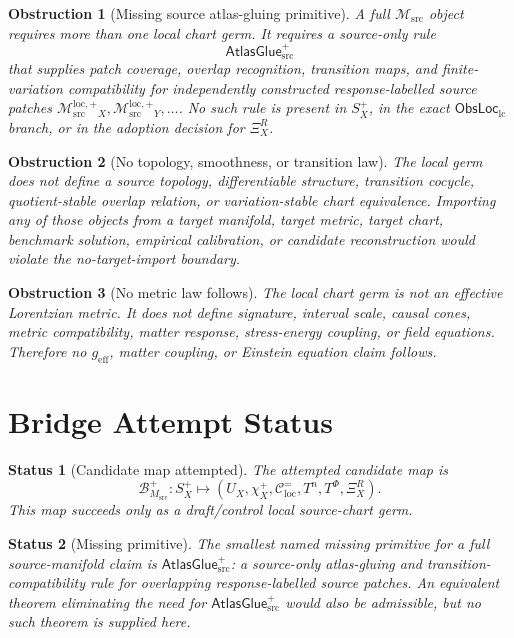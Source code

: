 \documentclass[11pt]{article}
\newcommand{\ObsLocLC}{\mathsf{ObsLoc}_{\mathrm{lc}}}
\newcommand{\Msrc}{\mathcal{M}_{\mathrm{src}}}
\newcommand{\Mloc}{\mathcal{M}_{\mathrm{src}}^{\mathrm{loc},+}}
\newcommand{\geff}{g_{\mathrm{eff}}}
\newcommand{\XiR}{\Xi_X^R}
\newcommand{\Splus}{S_X^+}
\newcommand{\Cexact}{\mathcal{C}^{=}_{\mathrm{loc}}}
\newcommand{\BMsrc}{\mathcal{B}^{+}_{M_{\mathrm{src}}}}
\newcommand{\AtlasGlue}{\mathsf{AtlasGlue}_{\mathrm{src}}^{+}}
\newtheorem{obstruction}{Obstruction}
\newtheorem{status}{Status}
\begin{document}
\begin{obstruction}[Missing source atlas-gluing primitive]
A full \(\Msrc\) object requires more than one local chart germ. It
requires a source-only rule
\[
  \AtlasGlue
\]
that supplies patch coverage, overlap recognition, transition maps,
and finite-variation compatibility for independently constructed
response-labelled source patches
\(\Mloc_X,\Mloc_Y,\ldots\). No such rule is present in \(\Splus\), in
the exact \(\ObsLocLC\) branch, or in the adoption decision for
\(\XiR\).
\end{obstruction}

\begin{obstruction}[No topology, smoothness, or transition law]
The local germ does not define a source topology, differentiable
structure, transition cocycle, quotient-stable overlap relation, or
variation-stable chart equivalence. Importing any of those objects
from a target manifold, target metric, target chart, benchmark
solution, empirical calibration, or candidate reconstruction would
violate the no-target-import boundary.
\end{obstruction}

\begin{obstruction}[No metric law follows]
The local chart germ is not an effective Lorentzian metric. It does
not define signature, interval scale, causal cones, metric
compatibility, matter response, stress-energy coupling, or field
equations. Therefore no \(\geff\), matter coupling, or Einstein
equation claim follows.
\end{obstruction}

\section{Bridge Attempt Status}

\begin{status}[Candidate map attempted]
The attempted candidate map is
\[
  \BMsrc:\Splus\mapsto
  (U_X,\chi_X^+,\Cexact,T^n,T^\Phi,\XiR).
\]
This map succeeds only as a draft/control local source-chart germ.
\end{status}

\begin{status}[Missing primitive]
The smallest named missing primitive for a full source-manifold claim
is \(\AtlasGlue\): a source-only atlas-gluing and
transition-compatibility rule for overlapping response-labelled source
patches. An equivalent theorem eliminating the need for
\(\AtlasGlue\) would also be admissible, but no such theorem is
supplied here.
\end{status}
\end{document}
